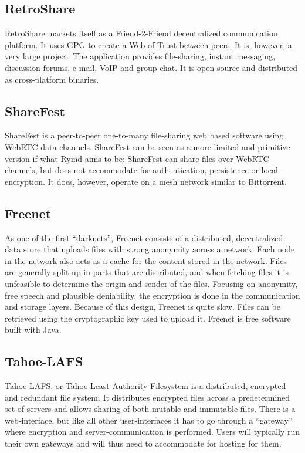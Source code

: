 \subsection{RetroShare}
RetroShare\cite{Retroshare:2014:Online} markets itself as a Friend-2-Friend decentralized communication platform. It uses GPG to create a Web of Trust between peers. It is, however, a very large project: The application provides file-sharing, instant messaging, discussion forums, e-mail, VoIP and group chat. It is open source and distributed as cross-platform binaries.
\subsection{ShareFest}
ShareFest\cite{Sharefest:2014:Online} is a peer-to-peer one-to-many file-sharing web based software using WebRTC data channels. ShareFest can be seen as a more limited and primitive version if what Rymd aims to be: ShareFest can share files over WebRTC channels, but does not accommodate for authentication, persistence or local encryption. It does, however, operate on a mesh network similar to Bittorrent.
\subsection{Freenet}
As one of the first “darknets”, Freenet\cite{Freenet:2014:Online} consists of a distributed, decentralized data store that uploads files with strong anonymity across a network. Each node in the network also acts as a cache for the content stored in the network. Files are generally split up in parts that are distributed, and when fetching files it is unfeasible to determine the origin and sender of the files. Focusing on anonymity, free speech and plausible deniability, the encryption is done in the communication and storage layers. Because of this design, Freenet is quite slow. Files can be retrieved using the cryptographic key used to upload it. Freenet is free software built with Java.
\subsection{Tahoe-LAFS}
Tahoe-LAFS\cite{Tahoe:2014:Online}, or Tahoe Least-Authority Filesystem is a distributed, encrypted and redundant file system. It distributes encrypted files across a predetermined set of servers and allows sharing of both mutable and immutable files. There is a web-interface, but like all other user-interfaces it has to go through a “gateway” where encryption and server-communication is performed. Users will typically run their own gateways and will thus need to accommodate for hosting for them. 
